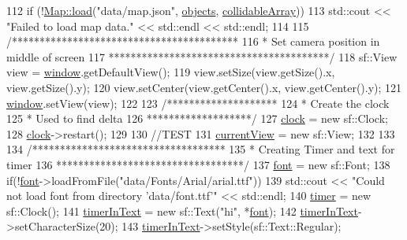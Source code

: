 \begin{DoxyCode}
112     \textcolor{keywordflow}{if} (!\hyperlink{classMap_a3a87d3a880cfd2d78224b797b44554a3}{Map::load}(\textcolor{stringliteral}{"data/map.json"}, \hyperlink{classTestApp_a8fbfb637e9e690ef9179cce7151c86c5}{objects}, \hyperlink{classTestApp_abd825724564edeb067da3c6f2c4a5f5f}{collidableArray}))
113         std::cout << \textcolor{stringliteral}{"Failed to load map data."} << std::endl << std::endl;
114 
115     \textcolor{comment}{/*****************************************}
116 \textcolor{comment}{     * Set camera position in middle of screen}
117 \textcolor{comment}{     ****************************************/}
118     sf::View view = \hyperlink{classTestApp_a0b6b080a777092db64519ef7c4309105}{window}.getDefaultView();
119     view.setSize(view.getSize().x, view.getSize().y);
120     view.setCenter(view.getCenter().x, view.getCenter().y);
121     \hyperlink{classTestApp_a0b6b080a777092db64519ef7c4309105}{window}.setView(view);
122 
123     \textcolor{comment}{/********************}
124 \textcolor{comment}{        * Create the clock}
125 \textcolor{comment}{        * Used to find delta}
126 \textcolor{comment}{        *******************/}
127     \hyperlink{classTestApp_a270d3cec0f81d6522f1fc1dc4b870cb5}{clock} = \textcolor{keyword}{new} sf::Clock;
128     \hyperlink{classTestApp_a270d3cec0f81d6522f1fc1dc4b870cb5}{clock}->restart();
129 
130     \textcolor{comment}{//TEST}
131     \hyperlink{classTestApp_ae638230755c6ce4c99ce5f0376f67302}{currentView} = \textcolor{keyword}{new} sf::View;
132 
133 
134     \textcolor{comment}{/***********************************}
135 \textcolor{comment}{     * Creating Timer and text for timer}
136 \textcolor{comment}{     **********************************/}
137     \hyperlink{classTestApp_abdcc9c2825cc0e067f2d59015e27c310}{font} = \textcolor{keyword}{new} sf::Font;
138     \textcolor{keywordflow}{if}(!\hyperlink{classTestApp_abdcc9c2825cc0e067f2d59015e27c310}{font}->loadFromFile(\textcolor{stringliteral}{"data/Fonts/Arial/arial.ttf"}))
139         std::cout << \textcolor{stringliteral}{"Could not load font from directory 'data/font.ttf'"} << std::endl;
140     \hyperlink{classTestApp_aa0f4ce165f864c08bee05f1e5b94f295}{timer} = \textcolor{keyword}{new} sf::Clock();
141     \hyperlink{classTestApp_a24027afb144ddefb348e6589029dddb3}{timerInText} = \textcolor{keyword}{new} sf::Text(\textcolor{stringliteral}{"hi"}, *\hyperlink{classTestApp_abdcc9c2825cc0e067f2d59015e27c310}{font});
142     \hyperlink{classTestApp_a24027afb144ddefb348e6589029dddb3}{timerInText}->setCharacterSize(20);
143     \hyperlink{classTestApp_a24027afb144ddefb348e6589029dddb3}{timerInText}->setStyle(sf::Text::Regular);

\end{DoxyCode}
